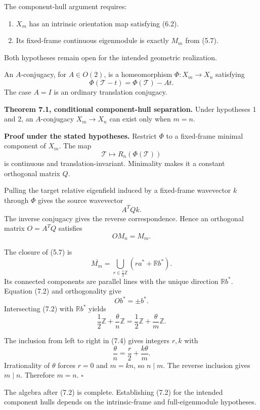 \documentclass[11pt]{article}
\begin{document}
The component-hull argument requires:

\begin{enumerate}
\item \(X_m\) has an intrinsic orientation map satisfying (6.2).
\item Its fixed-frame continuous eigenmodule is exactly \(M_m\) from (5.7).
\end{enumerate}

Both hypotheses remain open for the intended geometric realization.

An \(A\)-conjugacy, for \(A\in O(2)\), is a homeomorphism
\(\Phi:X_m\to X_n\) satisfying
\[
  \Phi(\mathcal T-t)=\Phi(\mathcal T)-At.
  \tag{7.1}
\]
The case \(A=I\) is an ordinary translation conjugacy.

\textbf{Theorem 7.1, conditional component-hull separation.} Under hypotheses 1
and 2, an \(A\)-conjugacy \(X_m\to X_n\) can exist only when \(m=n\).

\textbf{Proof under the stated hypotheses.} Restrict \(\Phi\) to a fixed-frame
minimal component of \(X_m\). The map
\[
  \mathcal T\longmapsto R_n(\Phi(\mathcal T))
\]
is continuous and translation-invariant. Minimality makes it a constant
orthogonal matrix \(Q\).

Pulling the target relative eigenfield induced by a fixed-frame wavevector
\(k\) through \(\Phi\) gives the source wavevector
\[
  A^{T}Qk.
\]
The inverse conjugacy gives the reverse correspondence. Hence an orthogonal
matrix \(O=A^TQ\) satisfies
\[
  OM_n=M_m.
  \tag{7.2}
\]

The closure of (5.7) is
\[
  \overline{M_m}
  =
  \bigcup_{r\in\frac12\mathbb Z}
  \left(ra^*+\mathbb Rb^*\right).
  \tag{7.3}
\]
Its connected components are parallel lines with the unique direction
\(\mathbb Rb^*\). Equation (7.2) and orthogonality give
\[
  Ob^*=\pm b^*.
\]
Intersecting (7.2) with \(\mathbb Rb^*\) yields
\[
  \frac12\mathbb Z+\frac{\theta}{n}\mathbb Z
  =
  \frac12\mathbb Z+\frac{\theta}{m}\mathbb Z.
  \tag{7.4}
\]

The inclusion from left to right in (7.4) gives integers \(r,k\) with
\[
  \frac{\theta}{n}=\frac r2+\frac{k\theta}{m}.
\]
Irrationality of \(\theta\) forces \(r=0\) and \(m=kn\), so \(n\mid m\).
The reverse inclusion gives \(m\mid n\). Therefore \(m=n\). \(\square\)

The algebra after (7.2) is complete. Establishing (7.2) for the intended
component hulls depends on the intrinsic-frame and full-eigenmodule
hypotheses.
\end{document}
